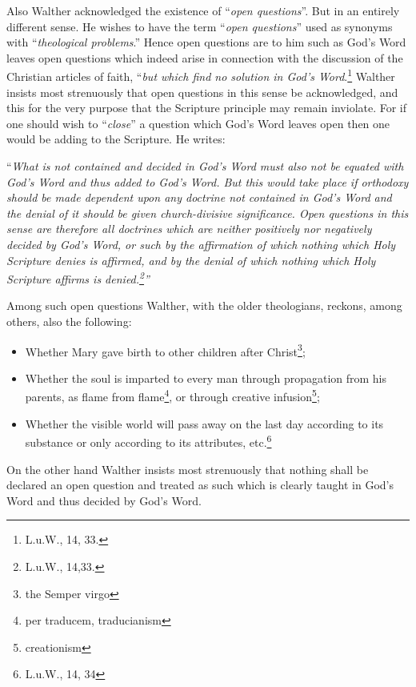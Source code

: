Also Walther acknowledged the existence of “\textit{open questions}”.  But in an entirely different sense.  He wishes to have the term “\textit{open questions}” used as synonyms with “\textit{theological problems}.”  Hence open questions are to him such as God’s Word leaves open questions which indeed arise in connection with the discussion of the Christian articles of faith, “\textit{but which find no solution in God’s Word}.\footnote{L.u.W., 14, 33.}  Walther insists most strenuously that open questions in this sense be acknowledged, and this for the very purpose that the Scripture principle may remain inviolate.  For if one should wish to “\textit{close}” a question which God’s Word leaves open then one would be adding to the Scripture.  He writes: \begin{displayquote}``\textit{What is not contained and decided in God’s Word must also not be equated with God’s Word and thus added to God’s Word.  But this would take place if orthodoxy should be made dependent upon any doctrine not contained in God’s Word and the denial of it should be given church-divisive significance.  Open questions in this sense are therefore all doctrines which are neither positively nor negatively decided by God’s Word, or such by the affirmation of which nothing which Holy Scripture denies is affirmed, and by the denial of which nothing which Holy Scripture affirms is denied.\footnote{L.u.W., 14,33.}''}\end{displayquote}
Among such open questions Walther, with the older theologians, reckons, among others, also the following:\begin{itemize}\item Whether Mary gave birth to other children after Christ\footnote{the Semper virgo};\item Whether the soul is imparted to every man through propagation from his parents, as flame from flame\footnote{per traducem, traducianism}, or through creative infusion\footnote{creationism};\item Whether the visible world will pass away on the last day according to its substance or only according to its attributes, etc.\footnote{L.u.W., 14, 34}\end{itemize}  On the other hand Walther insists most strenuously that nothing shall be declared an open question and treated as such which is clearly taught in God’s Word and thus decided by God’s Word.
\divider
